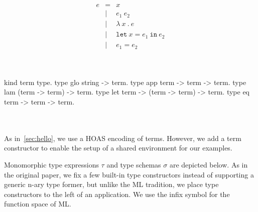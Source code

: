 \documentclass[a4paper, 11pt]{book}
\begin{document}
\begin{center}
\begin{minipage}{0.35\textwidth}
$$
\begin{array}{lrl}
  e & =     & x                                 \\
  & \vert & e_1\ e_2                            \\
  & \vert & \lambda\ x\ .\ e                    \\
  & \vert & \mathtt{let}\ x = e_1\ \mathtt{in}\ e_2 \\
  & \vert & e_1 = e_2 \\
\end{array}
$$
\end{minipage}~~
\begin{minipage}{0.60\textwidth}
\vspace{0.5em}
\begin{elpicodelj}
kind term   type.
type glo    string -> term.
type app    term -> term -> term.
type lam    (term -> term) -> term.
type let    term -> (term -> term) -> term.
type eq     term -> term -> term.
\end{elpicodelj}
\end{minipage}
\end{center}
~\\  
~\\  

As in~\cref{sec:hello}, we use a HOAS encoding of terms. However, we add a
 term constructor to enable the setup of a shared environment
for our examples.

Monomorphic type expressions $\tau$ and type schemas $\sigma$ are depicted
below. As in the original paper, we fix a few built-in type constructors
instead of supporting a generic n-ary type former, but unlike the ML
tradition, we place type constructors to the left of an application. We use
the infix symbol \elpi{-->} for the function space of ML.
\end{document}
